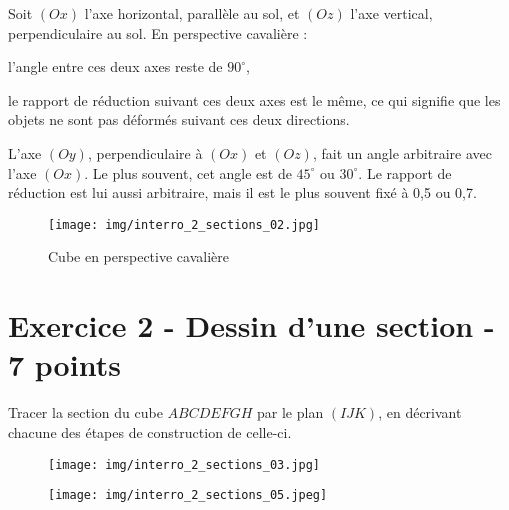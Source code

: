 \documentclass{exam}
\begin{document}
\begin{questions}
\begin{solution}
Soit $(Ox)$ l'axe horizontal, parallèle au sol, et $(Oz)$ l'axe vertical, perpendiculaire au sol. En perspective cavalière :  
\begin{compactitem}
    \item l'angle entre ces deux axes reste de $90^\circ$,
    \item le rapport de réduction suivant ces deux axes est le même, ce qui signifie que les objets ne sont pas déformés suivant ces deux directions.
\end{compactitem}

L'axe $(Oy)$, perpendiculaire à $(Ox)$ et $(Oz)$, fait un angle arbitraire avec l'axe $(Ox)$. Le plus souvent, cet angle est de $45^\circ$ ou $30^\circ$. Le rapport de réduction est lui aussi arbitraire, mais il est le plus souvent fixé à 0,5 ou 0,7.


  \begin{figure}[H]
    \centering
    \texttt{[image: img/interro\_2\_sections\_02.jpg]}
    \captionsetup{labelformat=empty}
    \caption{\label{} Cube en perspective cavalière}
  \end{figure}
  \end{solution}

\end{questions}


\section*{Exercice 2 - Dessin d'une section - 7 points}

\begin{questions}

\question[7]  Tracer la section du cube $ABCDEFGH$ par le plan $(IJK)$, en décrivant chacune des étapes de construction de celle-ci.

\begin{figure}[H]
  \centering
  \texttt{[image: img/interro\_2\_sections\_03.jpg]}
  \captionsetup{labelformat=empty}
  \caption{\label{}}
\end{figure}
\begin{solution}
  \begin{figure}[H]
    \centering
    \texttt{[image: img/interro\_2\_sections\_05.jpeg]}
    \captionsetup{labelformat=empty}
    \caption{\label{}}
  \end{figure}
\end{solution}
\end{questions}
\end{document}
